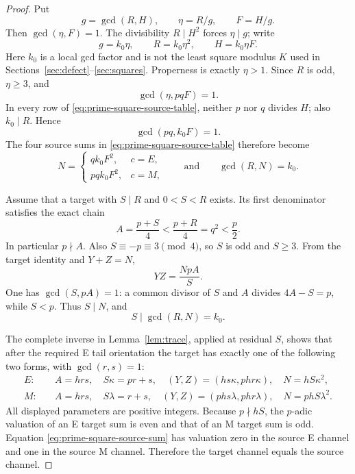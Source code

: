 \begin{proof}
Put
\[
 g=\gcd(R,H),\qquad \eta=R/g,\qquad F=H/g.
\]
Then $\gcd(\eta,F)=1$.  The divisibility $R\mid H^2$ forces
$\eta\mid g$; write
\begin{equation}\label{eq:prime-square-canonical}
 g=k_0\eta,\qquad
 R=k_0\eta^2,\qquad H=k_0\eta F.
\end{equation}
Here $k_0$ is a local gcd factor and is not the least square modulus $K$
used in Sections~\ref{sec:defect}--\ref{sec:squares}.  Properness is exactly
$\eta>1$.  Since $R$ is odd, $\eta\ge3$, and
\[
 \gcd(\eta,pqF)=1.
\]
In every row of \eqref{eq:prime-square-source-table}, neither $p$ nor $q$
divides $H$; also $k_0\mid R$.  Hence
\begin{equation}\label{eq:pq-coprime-source}
 \gcd(pq,k_0F)=1.
\end{equation}
The four source sums in \eqref{eq:prime-square-source-table} therefore become
\begin{equation}\label{eq:prime-square-source-sum}
 N=
 \begin{cases}
 qk_0F^2,&c=E,\\
 pqk_0F^2,&c=M,
 \end{cases}
 \qquad\text{and}\qquad
 \gcd(R,N)=k_0.
\end{equation}

Assume that a target with $S\mid R$ and $0<S<R$ exists.  Its first
denominator satisfies the exact chain
\[
 A=\frac{p+S}{4}<\frac{p+R}{4}=q^2<\frac p2.
\]
In particular $p\nmid A$.  Also
$S\equiv-p\equiv3\pmod4$, so $S$ is odd and $S\ge3$.  From the target
identity and $Y+Z=N$,
\[
 YZ=\frac{NpA}{S}.
\]
One has $\gcd(S,pA)=1$: a common divisor of $S$ and $A$ divides
$4A-S=p$, while $S<p$.  Thus $S\mid N$, and
\begin{equation}\label{eq:S-divides-k0}
 S\mid\gcd(R,N)=k_0.
\end{equation}

The complete inverse in Lemma~\ref{lem:trace}, applied at residual $S$,
shows that after the required E tail orientation the target has exactly one
of the following two forms, with $\gcd(r,s)=1$:
\begin{align}
 E:\quad&
 A=hrs,\quad S\kappa=pr+s,\quad
 (Y,Z)=(hs\kappa,phr\kappa),\quad
 N=hS\kappa^2,\label{eq:target-E-fixed-sum}\\
 M:\quad&
 A=hrs,\quad S\lambda=r+s,\quad
 (Y,Z)=(phs\lambda,phr\lambda),\quad
 N=phS\lambda^2.\label{eq:target-M-fixed-sum}
\end{align}
All displayed parameters are positive integers.  Because $p\nmid hS$, the
$p$-adic valuation of an E target sum is even and that of an M target sum is
odd.  Equation \eqref{eq:prime-square-source-sum} has valuation zero in the
source E channel and one in the source M channel.  Therefore the target
channel equals the source channel.


\end{proof}
